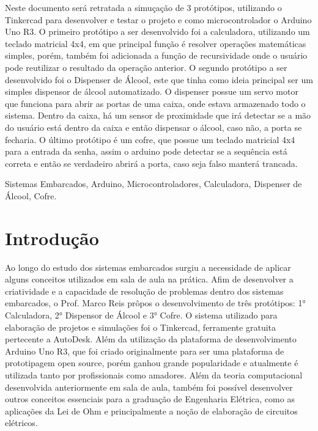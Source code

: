 \documentclass[conference]{IEEEtran}
\begin{document}
\begin{Resumo}
Neste documento será retratada a simuçação de 3 protótipos,
utilizando o Tinkercad para desenvolver e testar o projeto e como microcontrolador o Arduino Uno R3.
O primeiro protótipo a ser desenvolvido foi a calculadora, utilizando um teclado matricial 4x4, em que principal função é resolver
operações matemáticas simples, porém, também foi adicionada a função de recursividade onde o usuário pode reutilizar o resultado 
da operação anterior. O segundo protótipo a ser desenvolvido foi o Dispenser de Álcool, este que tinha como ideia principal
ser um simples dispensor de álcool automatizado. O dispenser possue um servo motor que funciona para abrir as portas de uma caixa,
onde estava armazenado todo o sistema. Dentro da caixa, há um sensor de proximidade que irá detectar se a mão do usuário está dentro da caixa
e então dispensar o álcool, caso não, a porta se fecharia. O último protótipo é um cofre, que possue um teclado matricial 4x4 para a entrada da senha,
assim o arduino pode detectar se a sequência está correta e então se verdadeiro abrirá a porta, caso seja falso manterá trancada.

\end{Resumo}

\begin{IEEEkeywords}
Sistemas Embarcados, Arduino, Microcontroladores, Calculadora, Dispenser de Álcool, Cofre.
\end{IEEEkeywords}

\section{Introdução}
Ao longo do estudo dos sistemas embarcados surgiu a necessidade de aplicar alguns conceitos utilizados em sala de aula na prática.
Afim de desenvolver a criatividade e a capacidade de resolução de problemas dentro dos sistemas embarcados, o Prof. Marco Reis prôpos 
o desenvolvimento de três protótipos: 1° Calculadora, 2° Dispensor de Álcool e 3° Cofre. 
O sistema utilizado para elaboração de projetos e simulações foi o Tinkercad, ferramente gratuita pertecente a AutoDesk. Além da utilização 
da plataforma de desenvolvimento Arduino Uno R3, que foi criado originalmente para ser uma plataforma de prototipagem open source, porém 
ganhou grande popularidade e atualmente é utilizada tanto por profissionais como amadores. Além da teoria computacional desenvolvida anteriormente em sala de aula, 
também foi possível desenvolver outros conceitos essenciais para a graduação de Engenharia Elétrica, como as aplicações da Lei de Ohm e 
principalmente a noção de elaboração de circuitos elétricos. 
\end{document}
